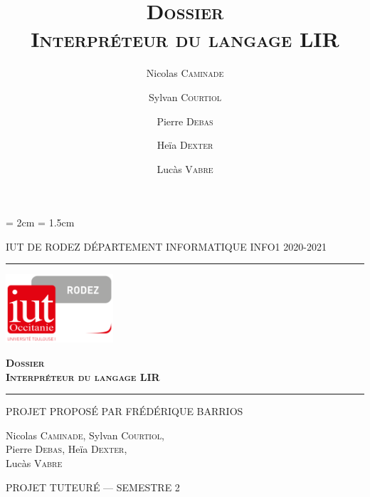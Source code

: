 \documentclass[12pt,a4paper,titlepage,openright]{report}
\title{\textsc{\textbf{ Dossier
            \\Interpréteur du langage LIR}
}}
\date{}
\author{Nicolas \textsc{Caminade} \and Sylvan \textsc{Courtiol} \and Pierre
    \textsc{Debas} \and Heïa \textsc{Dexter} \and Lucàs \textsc{Vabre} }
\begin{document}
    \lhead{\leftmark}

    \cfoot{\thepage}
    \headheight = 2cm
    \headsep = 1.5cm

    \begin{titlepage}
        \selectfont

        \begin{center}\normalsize
            \MakeUppercase{IUT de Rodez \hfill Département informatique
                \hfill INFO1 2020-2021}
        \end{center}
        \vspace*{0.1cm}
        \hrule
        \vspace*{0.2cm}
        \begin{flushright}
            \includegraphics[width=4cm]{img/logoiut}
        \end{flushright}
        \vspace*{2cm}
        \begin{flushright}\Huge
            \textsc{\textbf{ Dossier
                    \\Interpréteur du langage LIR}}
        \end{flushright}
        \hrule
        \begin{flushleft}
            \MakeUppercase{Projet proposé par Frédérique Barrios}
        \end{flushleft}
        \vspace*{2cm}
        \begin{center}\Large
            Nicolas \textsc{Caminade}, Sylvan \textsc{Courtiol},\\
            Pierre \textsc{Debas}, Heïa \textsc{Dexter}, \\
            Lucàs \textsc{Vabre}
        \end{center}
        \vfill
        \begin{center}\normalsize
            \MakeUppercase{Projet tuteuré --- Semestre 2}
        \end{center}
    \end{titlepage}
\end{document}
